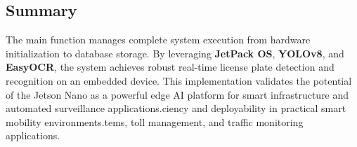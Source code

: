 \subsection{Summary}
The main function manages complete system execution from hardware initialization to database storage.  
By leveraging \textbf{JetPack OS}, \textbf{YOLOv8}, and \textbf{EasyOCR}, the system achieves robust real-time license plate detection and recognition on an embedded device.  
This implementation validates the potential of the Jetson Nano as a powerful edge AI platform for smart infrastructure and automated surveillance applications.ciency and deployability in practical smart mobility environments.tems, toll management, and traffic monitoring applications.